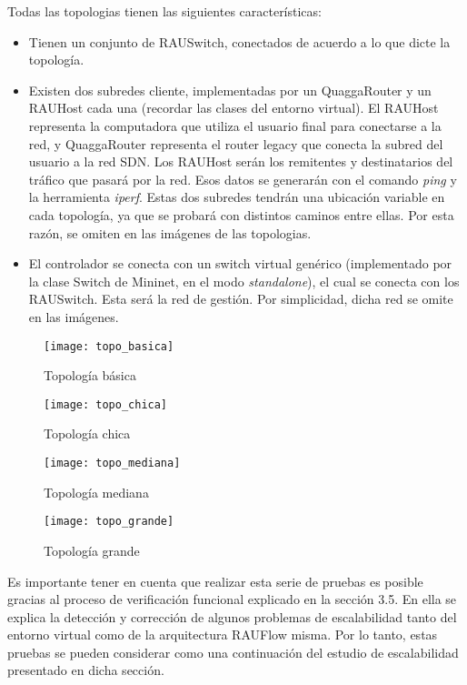 Todas las topologias tienen las siguientes características:
\begin{itemize}
	\item Tienen un conjunto de RAUSwitch, conectados de acuerdo a lo que dicte la topología.
	\item Existen dos subredes cliente, implementadas por un QuaggaRouter y un RAUHost cada una (recordar las clases del entorno virtual). El RAUHost representa la computadora que utiliza el usuario final para conectarse a la red, y QuaggaRouter representa el router legacy que conecta la subred del usuario a la red SDN. Los RAUHost serán los remitentes y destinatarios del tráfico que pasará por la red. Esos datos se generarán con el comando \textit{ping} y la herramienta \textit{iperf}. Estas dos subredes tendrán una ubicación variable en cada topología, ya que se probará con distintos caminos entre ellas. Por esta razón, se omiten en las imágenes de las topologias.
	\item El controlador se conecta con un switch virtual genérico (implementado por la clase Switch de Mininet, en el modo \textit{standalone}), el cual se conecta con los RAUSwitch. Esta será la red de gestión. Por simplicidad, dicha red se omite en las imágenes.
\end{itemize}

\begin{figure}[H]
	\caption{Topología básica}
	\texttt{[image: topo\_basica]}
	\centering
	\label{fig:topo_basica}
\end{figure}

\begin{figure}[H]
	\caption{Topología chica}
	\texttt{[image: topo\_chica]}
	\centering
	\label{fig:topo_chica}
\end{figure}

\begin{figure}[H]
	\caption{Topología mediana}
	\texttt{[image: topo\_mediana]}
	\centering
	\label{fig:topo_mediana}
\end{figure}

\begin{figure}[H]
	\caption{Topología grande}
	\texttt{[image: topo\_grande]}
	\centering
	\label{fig:topo_grande}
\end{figure}

Es importante tener en cuenta que realizar esta serie de pruebas es posible gracias al proceso de verificación funcional explicado en la sección 3.5. En ella se explica la detección y corrección de algunos problemas de escalabilidad tanto del entorno virtual como de la arquitectura RAUFlow misma. Por lo tanto, estas pruebas se pueden considerar como una continuación del estudio de escalabilidad presentado en dicha sección.

